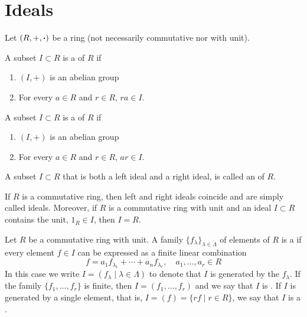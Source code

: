 
\section{Ideals}

\begin{definition}
	Let $(R,+,\vdot)$ be a ring (not necessarily commutative nor with unit).
	\begin{enumeratedef}
		\item A subset $I \subset R$ is a  of $R$ if
		\begin{enumerate}[label={(i.\alph*)}]
			\item $(I,+)$ is an abelian group
			\item For every $a \in R$ and $r \in R$, $r a \in I$.
		\end{enumerate}
		\item A subset $I \subset R$ is a  of $R$ if 
		\begin{enumerate}[label={(ii.\alph*)}]
			\item $(I,+)$ is an abelian group
			\item For every $a \in R$ and $r \in R$, $a r \in I$.
		\end{enumerate}
		\item A subset $I \subset R$ that is both a left ideal and a right ideal, is called an  of $R$.
	\end{enumeratedef}
\end{definition}

If $R$ is a commutative ring, then left and right ideals coincide and are simply called ideals. Moreover, if $R$ is a commutative ring with unit and an ideal $I \subset R$ contains the unit, $1_R \in I$, then $I = R$.

\begin{definition}
	Let $R$ be a commutative ring with unit. A family $\{ f_{\lambda} \}_{\lambda \in \Lambda}$ of elements of $R$ is a  if every element $f \in I$ can be expressed as a finite linear combination
	\[
		f = a_1 f_{\lambda_1} + \cdots + a_n f_{\lambda_r}, \quad a_1, \ldots, a_r \in R
	\]
	In this case we write $I = (f_{\lambda} \mid \lambda \in \Lambda)$ to denote that $I$ is generated by the $f_\lambda$. If the family $\{ f_1, \ldots, f_r \}$ is finite, then $I = (f_1, \ldots, f_r)$ and we say that $I$ is . If $I$ is generated by a single element, that is, $I = (f) = \{ r f \mid r \in R \}$, we say that $I$ is a .
\end{definition}

